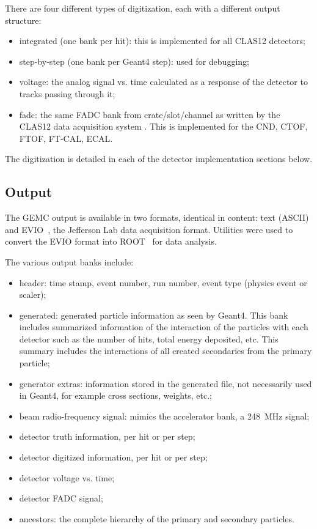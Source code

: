 There are four different types of digitization, each with a different output structure:

\begin{itemize}
	\item integrated (one bank per hit): this is implemented for all CLAS12 detectors;
	\item step-by-step (one bank per Geant4 step): used for debugging;
	\item voltage: the analog signal vs. time calculated as a response of the detector to tracks passing through it;
	\item fadc: the same FADC bank from crate/slot/channel as written by the CLAS12 data acquisition system
          \cite{daq-nim}. This is implemented for the CND, CTOF, FTOF, FT-CAL, ECAL.
\end{itemize}

The digitization is detailed in each of the detector implementation sections below.

\subsection{Output}

The GEMC output is available in two formats, identical in content: text (ASCII) and EVIO~\cite{evio}, the Jefferson Lab
data acquisition format. Utilities were used to convert the EVIO format into ROOT~\cite{root} for data analysis.

The various output banks include:

\begin{itemize}
	\item header: time stamp, event number, run number, event type (physics event or scaler);
	\item generated: generated particle information as seen by Geant4. This bank includes summarized information
          of the interaction of the particles with each detector such as the number of hits, total energy deposited, etc.
          This summary includes the interactions of all created secondaries from the primary particle;
	\item generator extras: information stored in the generated file, not necessarily used in Geant4, for example
          cross sections, weights, etc.;
	\item beam radio-frequency signal: mimics the accelerator bank, a 248~MHz signal;
	\item detector truth information, per hit or per step;
	\item detector digitized information, per hit or per step;
	\item detector voltage vs. time;
	\item detector FADC signal;
	\item ancestors: the complete hierarchy of the primary and secondary particles.
\end{itemize}

